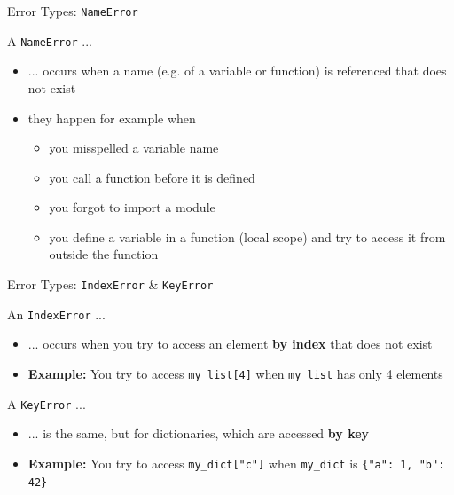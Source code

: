 \begin{frame}{Error Types: \texttt{NameError}}

    A \texttt{NameError} ...

    \begin{itemize}
        \item ... occurs when a name (e.g. of a variable or function) is referenced that does not exist
        \item they happen for example when
        \begin{itemize}
            \item you misspelled a variable name
            \item you call a function before it is defined
            \item you forgot to import a module
            \item you define a variable in a function (local scope) and try to access it from outside the function
        \end{itemize}
    \end{itemize}

\end{frame}

\begin{frame}{Error Types: \texttt{IndexError} \& \texttt{KeyError}}

    An \texttt{IndexError} ...
    \begin{itemize}
        \item ... occurs when you try to access an element \textbf{by index} that does not exist
        \item \textbf{Example:} You try to access \texttt{my\_list[4]} when \texttt{my\_list} has only 4 elements
    \end{itemize}

    \vspace{1em}

    A \texttt{KeyError} ...
    \begin{itemize}
        \item ... is the same, but for dictionaries, which are accessed \textbf{by key}
        \item \textbf{Example:} You try to access \texttt{my\_dict["c"]} when \texttt{my\_dict} is \texttt{\{"a": 1, "b": 42\}}
    \end{itemize}


\end{frame}

